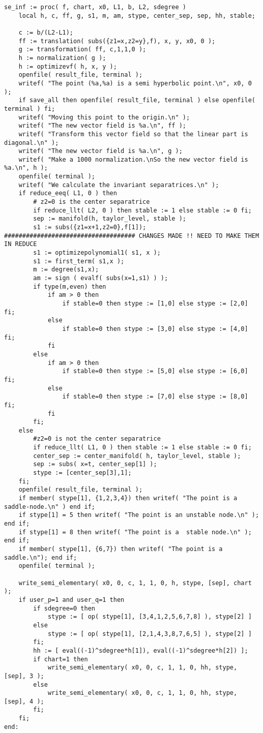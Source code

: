 \documentclass[a4paper,10pt]{article}
\begin{document}
\begin{lstlisting}[name=infinity]
se_inf := proc( f, chart, x0, L1, b, L2, sdegree )
    local h, c, ff, g, s1, m, am, stype, center_sep, sep, hh, stable;

    c := b/(L2-L1);
    ff := translation( subs({z1=x,z2=y},f), x, y, x0, 0 );
    g := transformation( ff, c,1,1,0 );
    h := normalization( g );
    h := optimizevf( h, x, y );
    openfile( result_file, terminal );
    writef( "The point (%a,%a) is a semi hyperbolic point.\n", x0, 0 );
    if save_all then openfile( result_file, terminal ) else openfile( terminal ) fi;
    writef( "Moving this point to the origin.\n" );
    writef( "The new vector field is %a.\n", ff );
    writef( "Transform this vector field so that the linear part is diagonal.\n" );
    writef( "The new vector field is %a.\n", g );
    writef( "Make a 1000 normalization.\nSo the new vector field is %a.\n", h );
    openfile( terminal );
    writef( "We calculate the invariant separatrices.\n" );
    if reduce_eeq( L1, 0 ) then
        # z2=0 is the center separatrice
        if reduce_llt( L2, 0 ) then stable := 1 else stable := 0 fi;
        sep := manifold(h, taylor_level, stable );
        s1 := subs({z1=x+1,z2=0},f[1]); #################################### CHANGES MADE !! NEED TO MAKE THEM IN REDUCE
        s1 := optimizepolynomial1( s1, x );
        s1 := first_term( s1,x );
        m := degree(s1,x);
        am := sign ( evalf( subs(x=1,s1) ) );
        if type(m,even) then
            if am > 0 then
                if stable=0 then stype := [1,0] else stype := [2,0] fi;
            else
                if stable=0 then stype := [3,0] else stype := [4,0] fi;
            fi
        else
            if am > 0 then
                if stable=0 then stype := [5,0] else stype := [6,0] fi;
            else
                if stable=0 then stype := [7,0] else stype := [8,0] fi;
            fi
        fi;
    else
        #z2=0 is not the center separatrice
        if reduce_llt( L1, 0 ) then stable := 1 else stable := 0 fi;
        center_sep := center_manifold( h, taylor_level, stable );
        sep := subs( x=t, center_sep[1] );
        stype := [center_sep[3],1];
    fi;
    openfile( result_file, terminal );
    if member( stype[1], {1,2,3,4}) then writef( "The point is a saddle-node.\n" ) end if;
    if stype[1] = 5 then writef( "The point is an unstable node.\n" ); end if;
    if stype[1] = 8 then writef( "The point is a  stable node.\n" ); end if;
    if member( stype[1], {6,7}) then writef( "The point is a saddle.\n"); end if;
    openfile( terminal );

    write_semi_elementary( x0, 0, c, 1, 1, 0, h, stype, [sep], chart );
    if user_p=1 and user_q=1 then
        if sdegree=0 then
            stype := [ op( stype[1], [3,4,1,2,5,6,7,8] ), stype[2] ]
        else
            stype := [ op( stype[1], [2,1,4,3,8,7,6,5] ), stype[2] ]
        fi;
        hh := [ eval((-1)^sdegree*h[1]), eval((-1)^sdegree*h[2]) ];
        if chart=1 then
            write_semi_elementary( x0, 0, c, 1, 1, 0, hh, stype, [sep], 3 );
        else
            write_semi_elementary( x0, 0, c, 1, 1, 0, hh, stype, [sep], 4 );
        fi;
    fi;
end:
\end{lstlisting}
\end{document}
